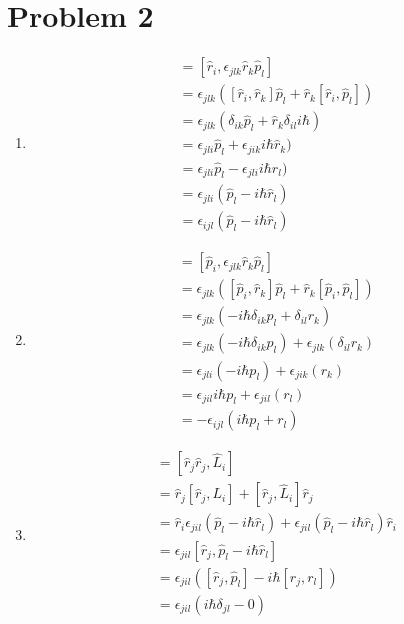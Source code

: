 \documentclass[12pt]{article}
\begin{document}
\section*{Problem 2}
\begin{enumerate}
\item \begin{align*}[\hat r_i,\hat L_j] &= [\hat r_i,\epsilon_{jlk}\hat r_k\hat p_l]\\
&= \epsilon_{jlk} ([\hat r_i,\hat r_k]\hat p_l + \hat r_k[\hat r_i,\hat p_l])\\
&= \epsilon_{jlk} (\delta_{ik}\hat p_l + \hat r_k \delta_{il}i\hbar)\\
&= \epsilon_{jli}\hat p_l + \epsilon_{jik}i\hbar\hat r_k)\\
&= \epsilon_{jli}\hat p_l - \epsilon_{jli}i\hbar\hat r_l)\\
&= \epsilon_{jli}(\hat p_l - i\hbar\hat r_l)\\
&= \boxed{\epsilon_{ijl}(\hat p_l - i\hbar\hat r_l)}
\end{align*}
\item \begin{align*}
[\hat p_i,\hat L_j] &= [\hat p_i,\epsilon_{jlk}\hat r_k\hat p_l]\\
&= \epsilon_{jlk} ([\hat p_i,\hat r_k]\hat p_l + \hat r_k[\hat p_i,\hat p_l])\\
&=\epsilon_{jlk}(-i\hbar\delta_{ik}p_l +\delta_{il}r_k)\\
&=\epsilon_{jlk}(-i\hbar\delta_{ik}p_l) +\epsilon_{jlk}(\delta_{il}r_k)\\
&=\epsilon_{jli}(-i\hbar p_l) +\epsilon_{jik}(r_k)\\
&=\epsilon_{jil}i\hbar p_l +\epsilon_{jil}(r_l)\\
&=\boxed{-\epsilon_{ijl}(i\hbar p_l +r_l)}
\end{align*}
\item \begin{align*}
[\mathbf r \cdot \mathbf r,\hat L_i] &= [\hat r_j\hat r_j,\hat L_i]\\
&=\hat r_j[\hat r_j,L_i] + [\hat r_j,\hat L_i]\hat r_j\\
&= \hat r_i\epsilon_{jil}(\hat p_l - i\hbar\hat r_l) + \epsilon_{jil}(\hat p_l - i\hbar\hat r_l)\hat r_i\\
&= \epsilon_{jil}[\hat r_j,\hat p_l- i\hbar\hat r_l]\\
&=\epsilon_{jil}([\hat r_j,\hat p_l] - i\hbar[r_j,r_l])\\
&=\epsilon_{jil}(i\hbar\delta_{jl}-0)\\

\end{align*}
\end{enumerate}
\end{document}
